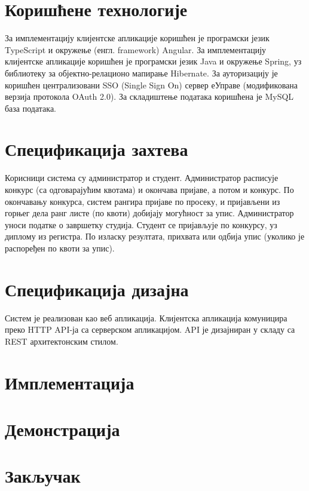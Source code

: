 \documentclass[a4paper]{article}
\begin{document}
\section*{Коришћене технологије}

За имплементацију клијентске апликације коришћен је програмски језик TypeScript\cite{typescript} и окружење (енгл. framework) Angular\cite{angular}.
За имплементацију клијентске апликације коришћен је програмски језик Java\cite{java} и окружење Spring\cite{spring}, уз библиотеку за објектно-релационо мапирање Hibernate\cite{hibernate}.
За ауторизацију је коришћен централизовани SSO (Single Sign On) сервер еУправе (модификована верзија протокола OAuth 2.0).
За складиштење података коришћена је MySQL\cite{mysql} база података.

\section*{Спецификација захтева}

Корисници система су администратор и студент. Администратор расписује конкурс (са одговарајућим квотама) и окончава пријаве,
а потом и конкурс. По окончавању конкурса, систем рангира пријаве по просеку, и пријављени из горњег дела ранг листе
(по квоти) добијају могућност за упис. Администратор уноси податке о завршетку студија. Студент се пријављује по конкурсу, уз диплому из регистра. По изласку резултата, прихвата или одбија упис (уколико је распоређен по квоти за упис).

\section*{Спецификација дизајна}

Систем је реализован као веб апликација. Клијентска апликација комуницира преко HTTP API-ја са серверском апликацијом. API је
дизајниран у складу са REST архитектонским стилом.

\section*{Имплементација}

\section*{Демонстрација}

\section*{Закључак}
\end{document}
